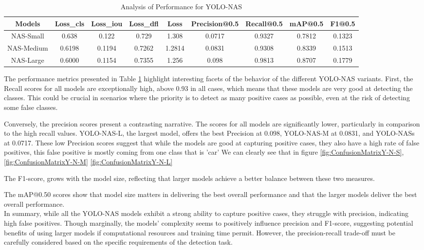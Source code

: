 \begin{table}[!htbp]
    \centering
    \caption{Analysis of Performance for YOLO-NAS}
    \label{tab:my_label}
    \footnotesize
    \begin{tabular}{|c|c|c|c|c|c|c|c|c|}
    \hline
     Models &  Loss\_cls&  Loss\_iou& Loss\_dfl & Loss &  Precision@0.5&  Recall@0.5&  mAP@0.5& F1@0.5\\
    \hline
    NAS-Small&  0.638&  0.122&  0.729&  1.308&  0.0717&  0.9327&  0.7812& 0.1323\\
    \hline
    NAS-Medium& 0.6198 &  0.1194&  0.7262&  1.2814& 0.0831 &  0.9308 & 0.8339 & 0.1513\\
    \hline
    NAS-Large& 0.6000 &  0.1154&  0.7355& 1.256 &  0.098&  0.9813&  0.8707& 0.1779\\
         \hline
    \end{tabular}
\end{table}

The performance metrics presented in Table \ref{tab:my_label} highlight interesting facets of the behavior of the different YOLO-NAS variants. First, the Recall scores for all models are exceptionally high, above 0.93 in all cases, which means that these models are very good at detecting the classes. This could be crucial in scenarios where the priority is to detect as many positive cases as possible, even at the risk of detecting some false classes.


Conversely, the precision scores present a contrasting narrative. The scores for all models are significantly lower, particularly in comparison to the high recall values. YOLO-NAS-L, the largest model, offers the best Precision at 0.098, YOLO-NAS-M at 0.0831, and YOLO-NASs at 0.0717. These low Precision scores suggest that while the models are good at capturing positive cases, they also have a high rate of false positives, this false positive is mostly coming from one class that is 'car' We can clearly see that in figure \ref{fig:ConfusionMatrixY-N-S}, \ref{fig:ConfusionMatrixY-N-M} \ref{fig:ConfusionMatrixY-N-L}

The F1-score, grows with the model size, reflecting that larger models achieve a better balance between these two measures.

The mAP@0.50 scores show that model size matters in delivering the best overall performance and that the larger models deliver the best overall performance.\\

In summary, while all the YOLO-NAS models exhibit
a strong ability to capture positive cases, they struggle with precision, indicating high false positives. Though marginally, the models’ complexity seems to positively influence precision and F1-score, suggesting potential benefits of
using larger models if computational resources and training time permit. However, the precision-recall trade-off must be carefully considered based on the specific requirements of the detection task.
